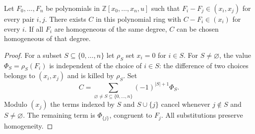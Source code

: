 \begin{nrlemma}\label{NR:C:interpolation}
Let $F_0,\ldots,F_n$ be polynomials in $\mathbb Z[x_0,\ldots,x_n,u]$ such that $F_i-F_j\in(x_i,x_j)$ for every pair $i,j$. There exists $C$ in this polynomial ring with $C-F_i\in(x_i)$ for every $i$. If all $F_i$ are homogeneous of the same degree, $C$ can be chosen homogeneous of that degree.
\end{nrlemma}
\begin{proof}
For a subset $S\subseteq\{0,\ldots,n\}$ let $\rho_S$ set $x_i=0$ for $i\in S$. For $S\ne\varnothing$, the value $\Phi_S=\rho_S(F_i)$ is independent of the choice of $i\in S$: the difference of two choices belongs to $(x_i,x_j)$ and is killed by $\rho_S$. Set
\[
 C=\sum_{\varnothing\ne S\subseteq\{0,\ldots,n\}}
       (-1)^{|S|+1}\Phi_S.
\]
Modulo $(x_j)$ the terms indexed by $S$ and $S\cup\{j\}$ cancel whenever $j\notin S$ and $S\ne\varnothing$. The remaining term is $\Phi_{\{j\}}$, congruent to $F_j$. All substitutions preserve homogeneity.
\end{proof}

